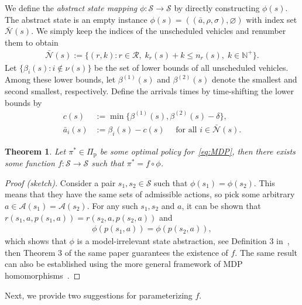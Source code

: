 \documentclass[a4paper]{report}
\theoremstyle{definition}
\theoremstyle{plain}
\newtheorem{theorem}{Theorem}[chapter]
\begin{document}
We define the \emph{abstract state mapping}
$\phi : \mathcal{S} \rightarrow \mathcal{S}$ by directly constructing $\phi(s)$.
%
The abstract state is an empty instance
$\phi(s) = ((\bar{a}, \rho, \sigma), \varnothing)$ with index set
$\bar{\mathcal{N}}(s)$.
%
We simply keep the indices of the unscheduled vehicles and renumber them to
obtain
\begin{align}
  \bar{\mathcal{N}}(s) := \{ (r,k) : r \in \mathcal{R}, \; k_r(s) + k \leq n_r(s), \; k\in\mathbb{N}^+ \} .
\end{align}
%
Let $\{ \beta_i(s) : i \notin \nu(s) \}$ be the set of lower bounds of all
unscheduled vehicles. Among these lower bounds, let $\beta^{(1)}(s)$ and
$\beta^{(2)}(s)$ denote the smallest and second smallest, respectively.
%
Define the arrivals times by time-shifting the lower bounds by
\begin{subequations}
\begin{align}
  c(s) &:= \min \{ \beta^{(1)}(s), \beta^{(2)}(s) - \delta \} , \\
  \bar{a}_i(s) &:= \beta_i(s) - c(s) \quad \text{ for all } i \in \bar{\mathcal{N}}(s) .
\end{align}
\end{subequations}


\begin{theorem}
  Let $\pi^* \in \Pi_\mathrm{p}$ be some optimal policy for~\eqref{eq:MDP}, then
  there exists some function $f : \mathcal{S} \rightarrow \mathcal{S}$ such that
  $\pi^* = f \circ \phi$.
\end{theorem}
\begin{proof}[Proof (sketch)]
  Consider a pair $s_1, s_2 \in \mathcal{S}$ such that $\phi(s_1) = \phi(s_2)$. This means that they have the same sets of admissible actions, so pick some arbitrary $a \in \mathcal{A}(s_1) = \mathcal{A}(s_2)$.
  For any such $s_1, s_2$ and $a$, it can be shown that
  $r(s_1, a, p(s_1, a)) = r(s_2, a, p(s_2, a))$ and
  \begin{align*}
    \phi(p(s_1, a)) = \phi(p(s_2, a)) ,
  \end{align*}
  which shows that $\phi$ is a model-irrelevant state abstraction, see
  Definition 3 in~\cite{liUnifiedTheoryState}, then Theorem 3 of the same paper
  guarantees the existence of $f$. The same result can also be established using
  the more general framework of MDP
  homomorphisms~\cite{ravindran2001symmetries}.
\end{proof}

Next, we provide two suggestions for parameterizing $f$.
\end{document}
